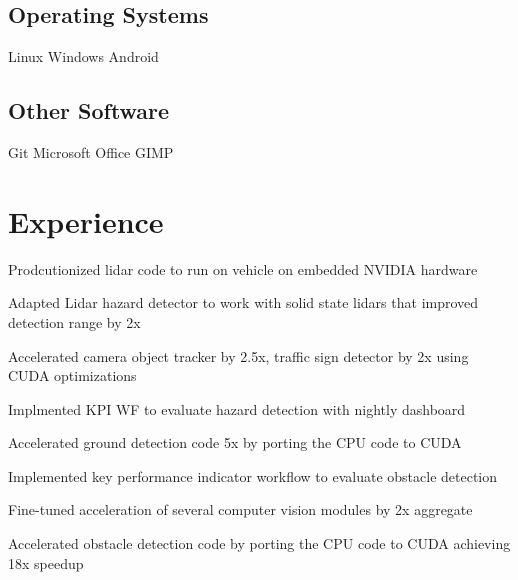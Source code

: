 \documentclass[]{deedy-resume-openfont}
\begin{document}
\begin{minipage}[t]{0.3\textwidth}
\subsection{Operating Systems}
Linux \textbullet{} Windows \textbullet{} Android \\
\sectionsep
\subsection{Other Software}
Git \textbullet{} Microsoft Office \textbullet{} GIMP \\
\sectionsep

%
%

\end{minipage}
\hfill
\begin{minipage}[t]{0.69\textwidth}


\section{Experience}

\vspace{\topsep} %
\begin{tightemize}
\item Prodcutionized lidar code to run on vehicle on embedded NVIDIA hardware
\item Adapted Lidar hazard detector to work with solid state lidars that improved detection range by 2x
\item Accelerated camera object tracker by 2.5x, traffic sign detector by 2x using CUDA optimizations
\item Implmented KPI WF to evaluate hazard detection with nightly dashboard
\item Accelerated ground detection code 5x by porting the CPU code to CUDA
\item Implemented key performance indicator workflow to evaluate obstacle detection
\item Fine-tuned acceleration of several computer vision modules by 2x aggregate
\end{tightemize}
\sectionsep

\vspace{\topsep} %
\begin{tightemize}
\item Accelerated obstacle detection code by porting the CPU code to CUDA achieving 18x speedup
\end{tightemize}
\sectionsep


\end{minipage}
\end{document}

